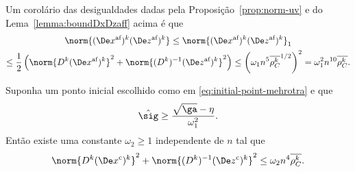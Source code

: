 Um corolário  das desigualdades dadas pela Proposição~\ref{prop:norm-uv} e do Lema~\ref{lemma:boundDxDzaff} acima é que 
\begin{multline}
\label{eq:normDxDzaff}
	\norm{ \dekx  \dekz  } \leq \norm{ \dekx  \dekz  }_{1}  \\ \leq \frac{1}{2}\left(\norm{\Dk \dekx}^{2} + \norm{\Dik  \dekz  }^{2}\right)
  					 \leq \left(\omega_1 n^5\dbvec{\rho_C^{k}}^{1/2}\right)^{2}
  					 = \omega_1^{2} n^{10}\dbvec{\rho_C^{k}}.
\end{multline}

\begin{lema}\label{lemma:boundDxDzc}
	Suponha um ponto inicial escolhido como em \eqref{eq:initial-point-mehrotra} e que \begin{equation}
	\label{eq:sig-eta-relation}
	\nextsig \geq \frac{\sqrt{\ga} - \eta}{\omega_1^{2}}.
\end{equation} Então existe uma constante $\omega_2\geq1$  independente de $n$ tal que 
	\begin{equation}\label{eq:lemma-boundDxDzcx}
		\norm{\Dk(\Decox)^{k}}^{2} + \norm{\Dik(\Decoz)^{k}}^{2} \leq \omega_2 n^{4}\dbvec{\rho_C^{k}}.
	\end{equation}
\end{lema}



